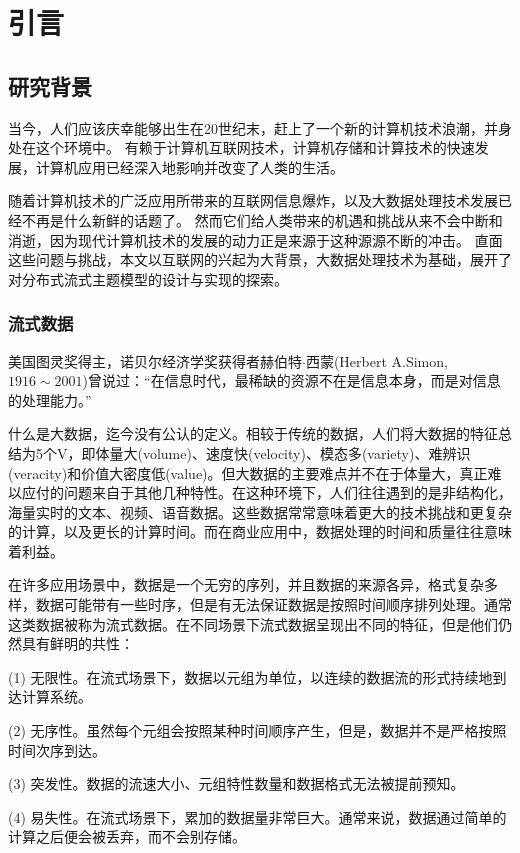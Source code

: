 
\chapter{引言}
\label{chapter:intro}

\section{研究背景}
当今，人们应该庆幸能够出生在20世纪末，赶上了一个新的计算机技术浪潮，并身处在这个环境中。
有赖于计算机互联网技术，计算机存储和计算技术的快速发展，计算机应用已经深入地影响并改变了人类的生活。

随着计算机技术的广泛应用所带来的互联网信息爆炸，以及大数据处理技术发展已经不再是什么新鲜的话题了。
然而它们给人类带来的机遇和挑战从来不会中断和消逝，因为现代计算机技术的发展的动力正是来源于这种源源不断的冲击。
直面这些问题与挑战，本文以互联网的兴起为大背景，大数据处理技术为基础，展开了对分布式流式主题模型的设计与实现的探索。

\subsection{流式数据}

美国图灵奖得主，诺贝尔经济学奖获得者赫伯特$\cdot$西蒙(Herbert A.Simon, $1916\sim2001$)曾说过：“在信息时代，最稀缺的资源不在是信息本身，而是对信息的处理能力。”

什么是大数据，迄今没有公认的定义。相较于传统的数据，人们将大数据的特征总结为5个V，即体量大(volume)、速度快(velocity)、模态多(variety)、难辨识(veracity)和价值大密度低(value)\cite{cxq2014Survey}。但大数据的主要难点并不在于体量大，真正难以应付的问题来自于其他几种特性。在这种环境下，人们往往遇到的是非结构化，海量实时的文本、视频、语音数据。这些数据常常意味着更大的技术挑战和更复杂的计算，以及更长的计算时间。而在商业应用中，数据处理的时间和质量往往意味着利益。

在许多应用场景中，数据是一个无穷的序列，并且数据的来源各异，格式复杂多样，数据可能带有一些时序，但是有无法保证数据是按照时间顺序排列处理。通常这类数据被称为流式数据。在不同场景下流式数据呈现出不同的特征，但是他们仍然具有鲜明的共性：

(1) 无限性。在流式场景下，数据以元组为单位，以连续的数据流的形式持续地到达计算系统。

(2) 无序性。虽然每个元组会按照某种时间顺序产生，但是，数据并不是严格按照时间次序到达。

(3) 突发性。数据的流速大小、元组特性数量和数据格式无法被提前预知。

(4) 易失性。在流式场景下，累加的数据量非常巨大。通常来说，数据通过简单的计算之后便会被丢弃，而不会别存储。

